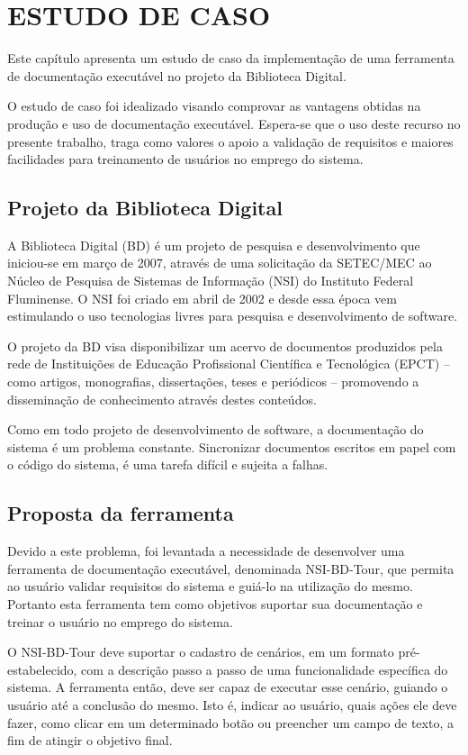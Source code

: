 \chapter{ESTUDO DE CASO}
Este capítulo apresenta um estudo de caso da implementação de uma ferramenta de documentação executável no projeto da Biblioteca Digital.

O estudo de caso foi idealizado visando comprovar as vantagens obtidas na produção e uso de documentação executável. Espera-se que o uso deste recurso no presente trabalho, traga como valores o apoio a validação de requisitos e maiores facilidades para treinamento de usuários no emprego do sistema.

\section{Projeto da Biblioteca Digital}

A Biblioteca Digital (BD) é um projeto de pesquisa e desenvolvimento que iniciou-se em março de 2007, através de uma solicitação da SETEC/MEC ao Núcleo de Pesquisa de Sistemas de Informação (NSI) do Instituto Federal Fluminense. O NSI foi criado em abril de 2002 e desde essa época vem estimulando o uso tecnologias livres para pesquisa e desenvolvimento de software.

O projeto da BD visa disponibilizar um acervo de documentos produzidos pela rede de Instituições de Educação Profissional Científica e Tecnológica (EPCT) – como artigos, monografias, dissertações, teses e periódicos – promovendo a disseminação de conhecimento através destes conteúdos.

Como em todo projeto de desenvolvimento de software, a documentação do sistema é um problema constante. Sincronizar documentos escritos em papel com o código do sistema, é uma tarefa difícil e sujeita a falhas.

\section{Proposta da ferramenta}

Devido a este problema, foi levantada a necessidade de desenvolver uma ferramenta de documentação executável, denominada NSI-BD-Tour, que permita ao usuário validar requisitos do sistema e guiá-lo na utilização do mesmo. Portanto esta ferramenta tem como objetivos suportar sua documentação e treinar o usuário no emprego do sistema.

O NSI-BD-Tour deve suportar o cadastro de cenários, em um formato pré-estabelecido, com a descrição passo a passo de uma funcionalidade específica do sistema. A ferramenta então, deve ser capaz de executar esse cenário, guiando o usuário até a conclusão do mesmo. Isto é, indicar ao usuário, quais ações ele deve fazer, como clicar em um determinado botão ou preencher um campo de texto, a fim de atingir o objetivo final.


